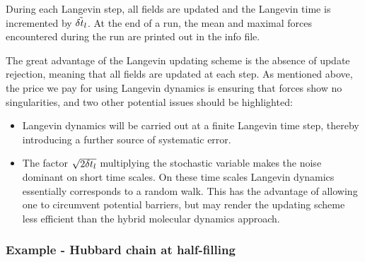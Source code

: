  During each Langevin step, all fields are updated and the Langevin time is incremented by $ \tilde{\delta t_{l}}$.  At the end of a run, the mean and maximal forces encountered during the run are printed out in the info file.

The great advantage of the Langevin updating scheme is the absence of update rejection, meaning that all fields are updated at each step. As mentioned above, the price we pay for using Langevin dynamics is ensuring that forces show no singularities, and two other potential issues should be highlighted:
\begin{itemize}
\item   Langevin dynamics will be carried out at a finite  Langevin time step, thereby introducing a further source of systematic error.
\item   The factor $\sqrt{2 \delta t_{l}} $   multiplying the stochastic variable makes the  noise dominant  on short time scales.  On these time scales  Langevin dynamics essentially  corresponds to a random walk. This has the advantage of allowing one to circumvent potential barriers, but may render the updating scheme less efficient than the hybrid molecular dynamics approach.
\end{itemize}

\subsubsection*{Example - Hubbard chain at half-filling}

